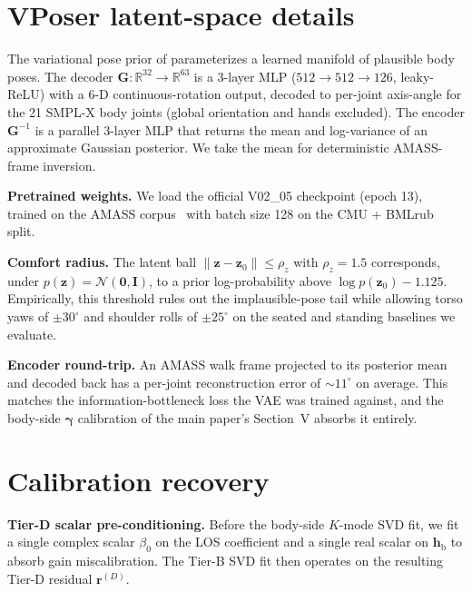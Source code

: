 \documentclass[10pt,journal,twocolumn]{IEEEtran}
\newcommand{\gammab}{\bm{\gamma}}
\newcommand{\hbody}{\bm{h}_{\mathrm{b}}}
\newcommand{\Reals}{\mathbb{R}}
\theoremstyle{plain}
\theoremstyle{definition}
\begin{document}
\section{VPoser latent-space details}\label{si:vposer}

The variational pose prior of \cite{Pavlakos2019VPoser} parameterizes
a learned manifold of plausible body poses. The decoder
$\bm{G}: \Reals^{32} \to \Reals^{63}$ is a 3-layer MLP
($512 \to 512 \to 126$, leaky-ReLU) with a 6-D continuous-rotation
output, decoded to per-joint axis-angle for the 21 SMPL-X body joints
(global orientation and hands excluded). The encoder $\bm{G}^{-1}$
is a parallel 3-layer MLP that returns the mean and log-variance of
an approximate Gaussian posterior. We take the mean for deterministic
AMASS-frame inversion.

\textbf{Pretrained weights.} We load the official V02\_05 checkpoint
(epoch 13), trained on the AMASS corpus~\cite{AMASS2019} with batch
size 128 on the CMU + BMLrub split.

\textbf{Comfort radius.} The latent ball
$\|\bm{z} - \bm{z}_0\| \leq \rho_z$ with $\rho_z = 1.5$ corresponds,
under $p(\bm{z}) = \mathcal{N}(\bm{0}, \bm{I})$, to a prior
log-probability above $\log p(\bm{z}_0) - 1.125$. Empirically, this
threshold rules out the implausible-pose tail while allowing torso
yaws of $\pm 30^{\circ}$ and shoulder rolls of $\pm 25^{\circ}$ on
the seated and standing baselines we evaluate.

\textbf{Encoder round-trip.} An AMASS walk frame projected to its
posterior mean and decoded back has a per-joint reconstruction
error of $\sim\!11^{\circ}$ on average. This matches the
information-bottleneck loss the VAE was trained against, and the
body-side $\gammab$ calibration of the main paper's Section~V
absorbs it entirely.

\section{Calibration recovery}\label{si:calibration}

\textbf{Tier-D scalar pre-conditioning.} Before the body-side
$K$-mode SVD fit, we fit a single complex scalar $\beta_0$ on the
LOS coefficient and a single real scalar on $\hbody$ to absorb gain
miscalibration. The Tier-B SVD fit then operates on the resulting
Tier-D residual $\bm{r}^{(D)}$.
\end{document}
